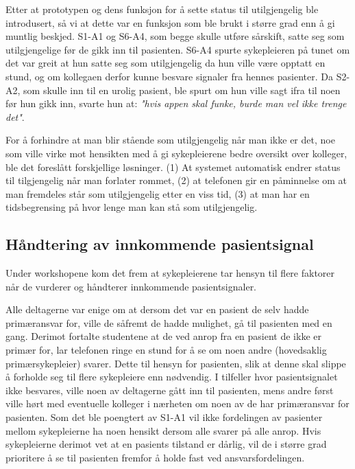 \noindent
Etter at prototypen og dens funksjon for å sette status til utilgjengelig ble introdusert, så vi at dette var en funksjon som ble brukt i større grad enn å gi muntlig beskjed.
S1-A1 og S6-A4, som begge skulle utføre sårskift, satte seg som utilgjengelige før de gikk inn til pasienten. S6-A4 spurte sykepleieren på tunet om det var greit at hun satte seg som utilgjengelig da hun ville være opptatt en stund, og om kollegaen derfor kunne besvare signaler fra hennes pasienter. Da S2-A2, som skulle inn til en urolig pasient, ble spurt om hun ville sagt ifra til noen før hun gikk inn, svarte hun at: \emph{"hvis appen skal funke, burde man vel ikke trenge det"}.

\noindent
For å forhindre at man blir stående som utilgjengelig når man ikke er det, noe som ville virke mot hensikten med å gi sykepleierene bedre oversikt over kolleger, ble det foreslått forskjellige løsninger. (1) At systemet automatisk endrer status til tilgjengelig når man forlater rommet, (2) at telefonen gir en påminnelse om at man fremdeles står som utilgjengelig etter en viss tid, (3) at man har en tidsbegrensing på hvor lenge man kan stå som utilgjengelig.


\subsection{Håndtering av innkommende pasientsignal}
Under workshopene kom det frem at sykepleierene tar hensyn til flere faktorer når de vurderer og håndterer innkommende pasientsignaler. 

\noindent
Alle deltagerne var enige om at dersom det var en pasient de selv hadde primæransvar for, ville de såfremt de hadde mulighet, gå til pasienten med en gang. Derimot fortalte studentene at de ved anrop fra en pasient de ikke er primær for, lar telefonen ringe en stund for å se om noen andre (hovedsaklig primærsykepleier) svarer. Dette til hensyn for pasienten, slik at denne skal slippe å forholde seg til flere sykepleiere enn nødvendig. I tilfeller hvor pasientsignalet ikke besvares, ville noen av deltagerne gått inn til pasienten, mens andre først ville hørt med eventuelle kolleger i nærheten om noen av de har primæransvar for pasienten. Som det ble poengtert av S1-A1 vil ikke fordelingen av pasienter mellom sykepleierne ha noen hensikt dersom alle svarer på alle anrop. Hvis sykepleierne derimot vet at en pasients tilstand er dårlig, vil de i større grad prioritere å se til pasienten fremfor å holde fast ved ansvarsfordelingen.

